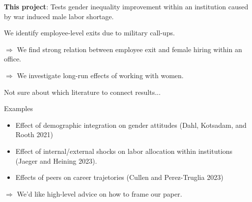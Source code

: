 \begin{transitionframe}
    \begin{wideitemize}
        \item \textbf{This project}: Tests gender inequality improvement within an institution caused by war induced male labor shortage.

        \pause
        \item We identify employee-level exits due to military call-ups.

        $\Rightarrow$ We find strong relation between employee exit and female hiring within an office.
        
        $\Rightarrow$ We investigate long-run effects of working with women.

        \pause
        \item Not sure about which literature to connect results...

        Examples
        \begin{itemize}
            \item Effect of demographic integration on gender attitudes (\color{gray}Dahl, Kotsadam, and Rooth 2021\color{black})
            \item Effect of internal/external shocks on labor allocation within institutions (\color{gray}Jaeger and Heining 2023\color{black}).
            \item Effects of peers on career trajetories (\color{gray}Cullen and Perez-Truglia 2023\color{black})
        \end{itemize}

        $\Rightarrow$ We'd like high-level advice on how to frame our paper.
    \end{wideitemize}
\end{transitionframe}